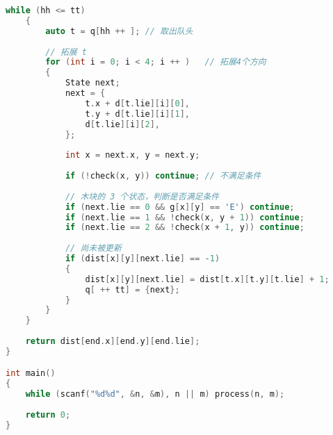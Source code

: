 \begin{lstlisting}[language=cpp]
    while (hh <= tt)
    {
        auto t = q[hh ++ ]; // 取出队头
        
        // 拓展 t
        for (int i = 0; i < 4; i ++ )   // 拓展4个方向
        {
            State next;
            next = {
                t.x + d[t.lie][i][0],
                t.y + d[t.lie][i][1],
                d[t.lie][i][2], 
            };
            
            int x = next.x, y = next.y;
            
            if (!check(x, y)) continue; // 不满足条件
            
            // 木块的 3 个状态，判断是否满足条件
            if (next.lie == 0 && g[x][y] == 'E') continue;  
            if (next.lie == 1 && !check(x, y + 1)) continue;
            if (next.lie == 2 && !check(x + 1, y)) continue;
            
            // 尚未被更新
            if (dist[x][y][next.lie] == -1)
            {
                dist[x][y][next.lie] = dist[t.x][t.y][t.lie] + 1;
                q[ ++ tt] = {next};
            }
        }
    }
    
    return dist[end.x][end.y][end.lie];
}

int main()
{
    while (scanf("%d%d", &n, &m), n || m) process(n, m);
    
    return 0;
}
\end{lstlisting}